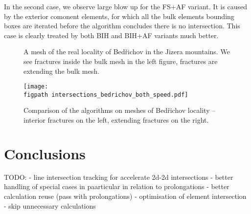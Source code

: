 \documentclass{elsarticle}
\newcommand{\figpath}{figures/}
\begin{document}
In the second case, we observe large blow up for the FS+AF variant. It is caused by the exterior comonent elements, 
for which all the bulk elements bounding boxes are iterated before the algorithm concludes there is no intersection.
This case is clearly treated by both BIH and BIH+AF variants much better.



\begin{figure}[!htb]
    \hspace{3pt}
    \caption{A mesh of the real locality of Bed{\v r}ichov in the Jizera mountains.
             We see fractures inside the bulk mesh in the left figure,
             fractures are extending the bulk mesh.}
    \label{fig:bedrichov_meshes}
\end{figure}

\begin{figure}[!htb]
    \centering
    \texttt{[image: \\figpath intersections\_bedrichov\_both\_speed.pdf]}
    \caption{Comparison of the algorithms on meshes of Bed{\v r}ichov locality -- interior fractures on the left,
             extending fractures on the right.}
    \label{fig:bedrichov_speed}
\end{figure}





\section{Conclusions}
\label{sec:conclusins}

TODO:
- line intersection tracking for accelerate 2d-2d intersections
- better handling of special cases in paarticular in relation to prolongations
- better calculation reuse (pass with prolongations)
- optimisation of element intersection - skip unnecessary calculations


\end{document}
